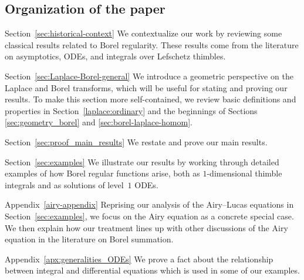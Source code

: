\documentclass{article}
\theoremstyle{definition}
\theoremstyle{plain}
\newenvironment{revised}{\color{DarkBlue}}{\color{black}}
\begin{document}
\subsection{Organization of the paper}
\begin{revised}
%
\begin{paragraph}{Section~\ref{sec:historical-context}}
We contextualize our work by reviewing some classical results related to Borel regularity. These results come from the literature on asymptotics, ODEs, and integrals over Lefschetz thimbles.\end{paragraph}
%
\begin{paragraph}{Section~\ref{sec:Laplace-Borel-general}}
We introduce a geometric perspective on the Laplace and Borel transforms, which will be useful for stating and proving our results. To make this section more self-contained, we review basic definitions and properties in Section~\ref{laplace:ordinary} and the beginnings of Sections \ref{sec:geometry_borel} and \ref{sec:borel-laplace-homom}.
\end{paragraph}
%
\begin{paragraph}{Section~\ref{sec:proof_main_results}}
We restate and prove our main results.
\end{paragraph}
%
\begin{paragraph}{Section~\ref{sec:examples}}
We illustrate our results by working through detailed examples of how Borel regular functions arise, both as $1$-dimensional thimble integrals and as solutions of level~$1$ ODEs.
\end{paragraph}
%
\begin{paragraph}{Appendix~\ref{airy-appendix}}
Reprising our analysis of the Airy--Lucas equations in Section~\ref{sec:examples}, we focus on the Airy equation as a concrete special case. We then explain how our treatment lines up with other discussions of the Airy equation in the literature on Borel summation.
\end{paragraph}
%
\begin{paragraph}{Appendix~\ref{apx:generalities_ODEs}}
We prove a fact about the relationship between integral and differential equations which is used in some of our examples.
\end{paragraph}
%
\end{revised}
\end{document}
